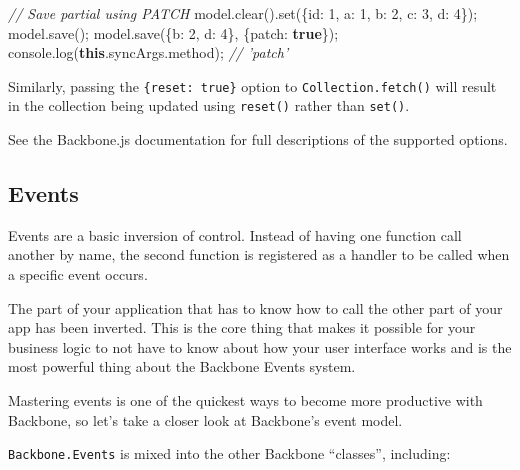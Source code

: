\documentclass[9pt]{book}
\newenvironment{Shaded}{}{}
\newcommand{\KeywordTok}[1]{\textcolor[rgb]{0.00,0.44,0.13}{\textbf{{#1}}}}
\newcommand{\DataTypeTok}[1]{\textcolor[rgb]{0.56,0.13,0.00}{{#1}}}
\newcommand{\DecValTok}[1]{\textcolor[rgb]{0.25,0.63,0.44}{{#1}}}
\newcommand{\CommentTok}[1]{\textcolor[rgb]{0.38,0.63,0.69}{\textit{{#1}}}}
\newcommand{\OtherTok}[1]{\textcolor[rgb]{0.00,0.44,0.13}{{#1}}}
\newcommand{\FunctionTok}[1]{\textcolor[rgb]{0.02,0.16,0.49}{{#1}}}
\newcommand{\NormalTok}[1]{{#1}}
\begin{document}
\begin{Shaded}
\begin{Highlighting}[]
\CommentTok{// Save partial using PATCH}
\OtherTok{model}\NormalTok{.}\FunctionTok{clear}\NormalTok{().}\FunctionTok{set}\NormalTok{(\{}\DataTypeTok{id}\NormalTok{: }\DecValTok{1}\NormalTok{, }\DataTypeTok{a}\NormalTok{: }\DecValTok{1}\NormalTok{, }\DataTypeTok{b}\NormalTok{: }\DecValTok{2}\NormalTok{, }\DataTypeTok{c}\NormalTok{: }\DecValTok{3}\NormalTok{, }\DataTypeTok{d}\NormalTok{: }\DecValTok{4}\NormalTok{\});}
\OtherTok{model}\NormalTok{.}\FunctionTok{save}\NormalTok{();}
\OtherTok{model}\NormalTok{.}\FunctionTok{save}\NormalTok{(\{}\DataTypeTok{b}\NormalTok{: }\DecValTok{2}\NormalTok{, }\DataTypeTok{d}\NormalTok{: }\DecValTok{4}\NormalTok{\}, \{}\DataTypeTok{patch}\NormalTok{: }\KeywordTok{true}\NormalTok{\});}
\OtherTok{console}\NormalTok{.}\FunctionTok{log}\NormalTok{(}\KeywordTok{this}\NormalTok{.}\OtherTok{syncArgs}\NormalTok{.}\FunctionTok{method}\NormalTok{);}
\CommentTok{// 'patch'}
\end{Highlighting}
\end{Shaded}

Similarly, passing the \texttt{\{reset: true\}} option to
\texttt{Collection.fetch()} will result in the collection being updated
using \texttt{reset()} rather than \texttt{set()}.

See the Backbone.js documentation for full descriptions of the supported
options.

\subsection{Events}\label{events}

Events are a basic inversion of control. Instead of having one function
call another by name, the second function is registered as a handler to
be called when a specific event occurs.

The part of your application that has to know how to call the other part
of your app has been inverted. This is the core thing that makes it
possible for your business logic to not have to know about how your user
interface works and is the most powerful thing about the Backbone Events
system.

Mastering events is one of the quickest ways to become more productive
with Backbone, so let's take a closer look at Backbone's event model.

\texttt{Backbone.Events} is mixed into the other Backbone ``classes'',
including:
\end{document}

